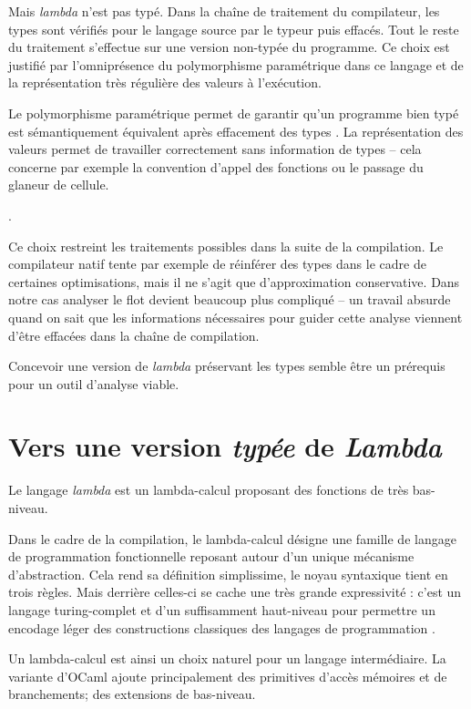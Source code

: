 Mais \emph{lambda} n'est pas typé. Dans la chaîne de traitement du
compilateur, les types sont vérifiés pour le langage source par le typeur puis
effacés. Tout le reste du traitement s'effectue sur une version non-typée du
programme. Ce choix est justifié par l'omniprésence du polymorphisme
paramétrique dans ce langage et de la représentation très régulière des valeurs
à l'exécution.

Le polymorphisme paramétrique permet de garantir qu'un programme bien typé est
sémantiquement équivalent après effacement des types .
La représentation des valeurs permet de travailler correctement sans
information de types -- cela concerne par exemple la convention d'appel des
fonctions ou le passage du glaneur de cellule.

.

Ce choix restreint les traitements possibles dans la suite de la compilation.
Le compilateur natif tente par exemple de réinférer des types dans le cadre de
certaines optimisations, mais il ne s'agit que d'approximation conservative.
Dans notre cas analyser le flot devient beaucoup plus compliqué -- un travail
absurde quand on sait que les informations nécessaires pour guider cette
analyse viennent d'être effacées dans la chaîne de compilation.

Concevoir une version de \emph{lambda} préservant les types semble être un
prérequis pour un outil d'analyse viable.

\section{Vers une version \emph{typée} de \emph{Lambda}}

Le langage \emph{lambda} est un lambda-calcul proposant des fonctions de très
bas-niveau.

Dans le cadre de la compilation, le lambda-calcul désigne une famille de
langage de programmation fonctionnelle reposant autour d'un unique mécanisme
d'abstraction.  Cela rend sa définition simplissime, le noyau syntaxique tient
en trois règles.  Mais derrière celles-ci se cache une très grande expressivité
: c'est un langage turing-complet et d'un suffisamment haut-niveau pour
permettre un encodage léger des constructions classiques des langages de
programmation \cite{LTU}.

Un lambda-calcul est ainsi un choix naturel pour un langage intermédiaire. La
variante d'OCaml ajoute principalement des primitives d'accès mémoires et de
branchements; des extensions de bas-niveau.

